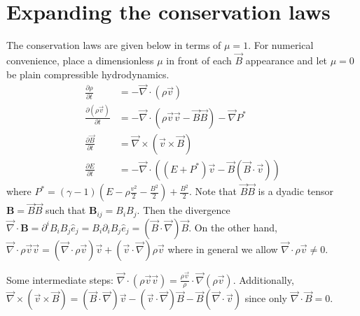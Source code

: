 \documentclass[10pt]{article}
\newcommand{\pd}[2]{\frac{\partial#1}{\partial#2}}
\begin{document}
\pagestyle{fancy}
\cfoot{\thepage/\pageref{LastPage}}

\section{Expanding the conservation laws}

The conservation laws are given below in terms of $\mu = 1$. For numerical convenience, place a dimensionless $\mu$ in front of each $\vec{B}$ appearance and let $\mu = 0$ be plain compressible hydrodynamics.
\begin{align}
    \pd{\rho}{t} &= -\vec{\nabla} \cdot (\rho \vec{v}) \nonumber\\
    \pd{(\rho \vec{v})}{t} &= -\vec{\nabla} \cdot (\rho \vec{v} \vec{v} - \vec{B} \vec{B}) - \vec{\nabla}P^* \nonumber\\
    \pd{\vec{B}}{t} &= \vec{\nabla} \times (\vec{v} \times \vec{B}) \nonumber\\
    \pd{E}{t} &= -\vec{\nabla} \cdot \left( (E + P^*)\vec{v} - \vec{B}(\vec{B} \cdot \vec{v}) \right)
\end{align}
where $P^* = (\gamma - 1)\left( E - \rho \frac{v^2}{2} - \frac{B^2}{2} \right) + \frac{B^2}{2}$. Note that $\vec{B}\vec{B}$ is a dyadic tensor $\mathbf{B} = \vec{B}\vec{B}$ such that $\mathbf{B}_{ij} = B_iB_j$. Then the divergence $\vec{\nabla} \cdot \mathbf{B} = \partial^iB_iB_j\hat{e}_j = B_i\partial_iB_j \hat{e}_j = \left( \vec{B} \cdot \vec{\nabla} \right)\vec{B}$. On the other hand, $\vec{\nabla} \cdot \rho\vec{v}\vec{v} = \left( \vec{\nabla} \cdot \rho\vec{v} \right)\vec{v} + (\vec{v} \cdot \vec{\nabla})\rho\vec{v}$ where in general we allow $\vec{\nabla} \cdot \rho \vec{v} \neq 0$. 

Some intermediate steps: $\vec{\nabla} \cdot (\rho \vec{v} \vec{v}) = \frac{\rho \vec{v}}{\rho} \cdot \vec{\nabla}(\rho \vec{v})$. Additionally, $\vec{\nabla} \times (\vec{v} \times \vec{B}) = (\vec{B} \cdot \vec{\nabla})\vec{v} - (\vec{v} \cdot \vec{\nabla})\vec{B} - \vec{B}(\vec{\nabla} \cdot \vec{v})$ since only $\vec{\nabla} \cdot \vec{B} = 0$.
\end{document}
